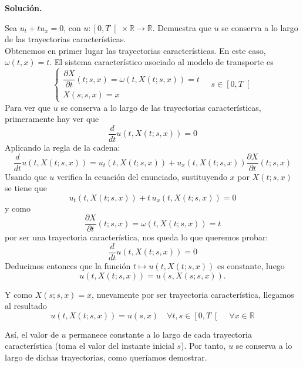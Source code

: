 \documentclass[12pt]{article}
\newcommand{\R}{\mathbb{R}}
\begin{document}
    \newpage
    \setcounter{ejercicio}{0} %
    \noindent
    \textbf{Solución.}

    \begin{ejercicio}
        Sea $u_t + t u_x = 0$, con $u : \left[0, T \right[ \times \R \to \R$. Demuestra que $u$ se conserva a lo largo de las trayectorias características. \\

        Obtenemos en primer lugar las trayectorias características. En este caso, $\omega(t,x) = t$. El sistema característico asociado al modelo de transporte es 
        \begin{equation*}
            \begin{cases}
                \dfrac{\partial X}{\partial t}(t;s,x)
                =\omega(t,X(t;s,x)) = t\\[6pt]
                X(s;s,x)=x
            \end{cases}\quad s \in \left[0, T \right[
        \end{equation*}
        Para ver que $u$ se conserva a lo largo de las trayectorias características, primeramente hay ver que 
        $$\dfrac{d}{dt}u(t,X(t;s,x)) = 0$$
        Aplicando la regla de la cadena:
        $$
        \dfrac{d}{dt}u(t,X(t;s,x)) =u_t(t,X(t;s,x)) + u_x(t,X(t;s,x))\frac{\partial X}{\partial t}(t;s,x)$$
        Usando que $u$ verifica la ecuación del enunciado, sustituyendo $x$ por $X(t;s,x)$ se tiene que
        $$u_t(t,X(t;s,x))+t\,u_x(t,X(t;s,x))=0$$
        y como 
        $$\dfrac{\partial X}{\partial t}(t;s,x) = \omega(t,X(t;s,x)) = t$$
        por ser una trayectoria característica, nos queda lo que queremos probar:
        $$\dfrac{d}{dt}u(t,X(t;s,x)) = 0$$
        Deducimos entonces que la función $t\mapsto u(t,X(t;s,x))$ es constante, luego
        $$
        u(t,X(t;s,x))=u(s,X(s;s,x)).
        $$

        Y como $X(s;s,x)=x$, nuevamente por ser trayectoria característica, llegamos al resultado
        $$
        \boxed{u(t,X(t;s,x))=u(s,x) \quad \forall t,s \in \left[0, T\right[ \quad \forall x \in \R}
        $$

        Así, el valor de $u$ permanece constante a lo largo de cada trayectoria característica (toma el valor del instante inicial $s$). Por tanto, $u$ se conserva a lo largo de dichas trayectorias, como queríamos demostrar.
    \end{ejercicio}
\end{document}
